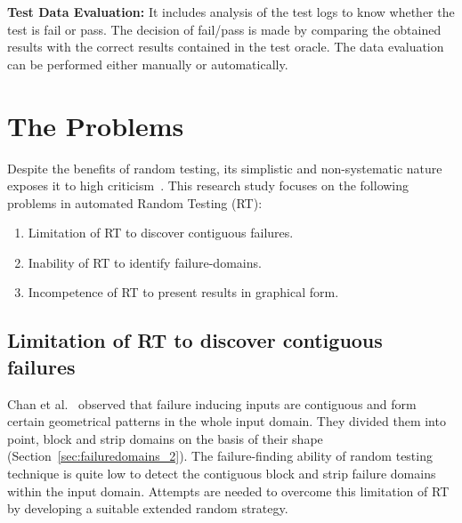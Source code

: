 \textbf{Test Data Evaluation:} It includes analysis of the test logs to know whether the test is fail or pass. The decision of fail/pass is made by comparing the obtained results with the correct results contained in the test oracle. The data evaluation can be performed either manually or automatically.

%

\section{The Problems}
Despite the benefits of random testing, its simplistic and non-systematic nature exposes it to high criticism~\cite{myers2011art, white1987software}. This research study focuses on the following problems in automated Random Testing (RT):


\begin{enumerate}
\item Limitation of RT to discover contiguous failures.
\item Inability of RT to identify failure-domains.
\item Incompetence of RT to present results in graphical form. 
\end{enumerate}

\subsection{Limitation of RT to discover contiguous failures}
Chan et al.~\cite{chan1996proportional} observed that failure inducing inputs are contiguous and form certain geometrical patterns in the whole input domain. They divided them into point, block and strip domains on the basis of their shape (Section~\ref{sec:failuredomains_2}). %
The failure-finding ability of random testing technique is quite low to detect the contiguous block and strip failure domains within the input domain. Attempts are needed to overcome this limitation of RT by developing a suitable extended random strategy.

